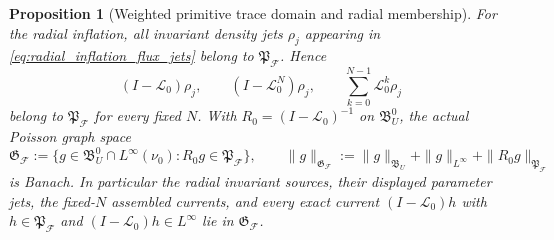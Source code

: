 \documentclass[11pt]{amsart}
\theoremstyle{compactplain}
\newtheorem{proposition}[theorem]{Proposition}
\theoremstyle{compactdefinition}
\theoremstyle{compactremark}
\newcommand{\Ltransfer}{\mathscr L}
\begin{document}
\begin{proposition}[Weighted primitive trace domain and radial membership]
For the radial inflation, all invariant density jets \(\rho_j\) appearing in
\eqref{eq:radial_inflation_flux_jets} belong to
\(\mathfrak P_{\mathscr F}\).  Hence
\[
 (I-\Ltransfer_0)\rho_j,\qquad
 (I-\Ltransfer_0^N)\rho_j,\qquad
 \sum_{k=0}^{N-1}\Ltransfer_0^k\rho_j
\]
belong to \(\mathfrak P_{\mathscr F}\) for every fixed \(N\).  With
\(R_0=(I-\Ltransfer_0)^{-1}\) on \(\mathfrak B_U^0\), the actual Poisson
graph space
\begin{equation}
\label{eq:actual_poisson_trace_graph_space}
 \mathfrak G_{\mathscr F}
 :=\{g\in\mathfrak B_U^0\cap L^\infty(\nu_0):R_0g\in
       \mathfrak P_{\mathscr F}\},\qquad
 \|g\|_{\mathfrak G_{\mathscr F}}
 :=\|g\|_{\mathfrak B_U}+\|g\|_{L^\infty}
   +\|R_0g\|_{\mathfrak P_{\mathscr F}}
\end{equation}
is Banach.  In particular the radial invariant
sources, their displayed parameter jets, the fixed-\(N\) assembled currents,
and every exact current \((I-\Ltransfer_0)h\) with
\(h\in\mathfrak P_{\mathscr F}\) and
\((I-\Ltransfer_0)h\in L^\infty\) lie in
\(\mathfrak G_{\mathscr F}\).
\end{proposition}
\end{document}
